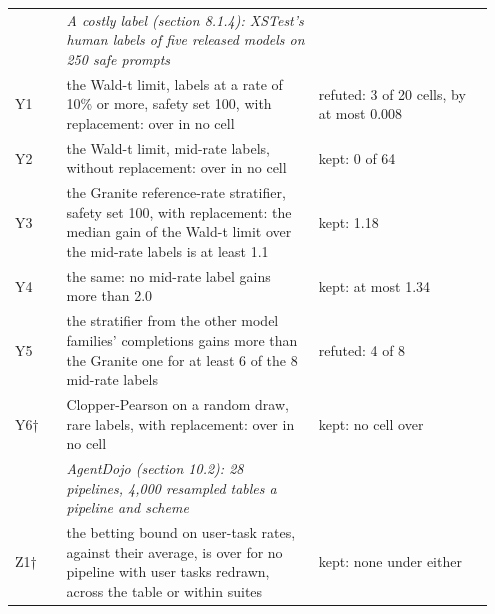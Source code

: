 \documentclass[11pt]{article}
\begin{document}
\begin{longtable}{@{}>{\raggedright\arraybackslash}p{0.101\linewidth}>{\raggedright\arraybackslash}p{0.499\linewidth}>{\raggedright\arraybackslash}p{0.346\linewidth}@{}}
 & \hspace{0pt}\emph{A costly label (section 8.1.4): XSTest's human labels of five released models on 250 safe prompts} &  \\
\hspace{0pt}Y1 & \hspace{0pt}the Wald-t limit, labels at a rate of 10\% or more, safety set 100, with replacement: over in no cell & \hspace{0pt}refuted: 3 of 20 cells, by at most 0.008 \\
\hspace{0pt}Y2 & \hspace{0pt}the Wald-t limit, mid-rate labels, without replacement: over in no cell & \hspace{0pt}kept: 0 of 64 \\
\hspace{0pt}Y3 & \hspace{0pt}the Granite reference-rate stratifier, safety set 100, with replacement: the median gain of the Wald-t limit over the mid-rate labels is at least 1.1 & \hspace{0pt}kept: 1.18 \\
\hspace{0pt}Y4 & \hspace{0pt}the same: no mid-rate label gains more than 2.0 & \hspace{0pt}kept: at most 1.34 \\
\hspace{0pt}Y5 & \hspace{0pt}the stratifier from the other model families' completions gains more than the Granite one for at least 6 of the 8 mid-rate labels & \hspace{0pt}refuted: 4 of 8 \\
\hspace{0pt}Y6† & \hspace{0pt}Clopper-Pearson on a random draw, rare labels, with replacement: over in no cell & \hspace{0pt}kept: no cell over \\
 & \hspace{0pt}\emph{AgentDojo (section 10.2): 28 pipelines, 4,000 resampled tables a pipeline and scheme} &  \\
\hspace{0pt}Z1† & \hspace{0pt}the betting bound on user-task rates, against their average, is over for no pipeline with user tasks redrawn, across the table or within suites & \hspace{0pt}kept: none under either \\

\end{longtable}
\end{document}
